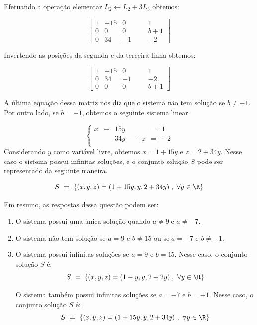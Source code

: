 \begin{solution}
Efetuando a operação elementar $L_2 \leftarrow L_2 + 3L_3$ obtemos:

$$ \left[\begin{array}{rrrr|rc}
  1 &   -15  &    0  & & &   1    \\
  0 &     0  &    0  & & &   b+1  \\ 
  0 &    34  &   -1  & & &   -2   \end{array}\right] $$

Invertendo as posições da segunda e da terceira linha obtemos:

$$ \left[\begin{array}{rrrr|rc}
  1 &   -15  &    0  & & &    1   \\
  0 &    34  &   -1  & & &   -2   \\ 
  0 &     0  &    0  & & &   b+1   \end{array}\right] $$

A última equação dessa matriz nos diz que o sistema não tem solução se $b \neq -1$.
Por outro lado, se $b=-1$, obtemos o seguinte sistema linear

$$\left\{\begin{array}{rrrrrrr}
 x & - &  15y &   &     & = &  1\\
   &   &  34y & - &   z & = & -2\\  \end{array} \right.$$\noindent 
Considerando $y$ como variável livre, obtemos $x=1+15y$ e $z=2+34y$. Nesse caso o sistema possui infinitas soluções, e o conjunto solução $S$ pode ser representado da seguinte maneira.

$$S\ =\ \left\{ (x,y,z) = (1+15y, y , 2+34y)\ ,\ \forall y \in \R \right\} $$

\bigskip
Em resumo, as respostas dessa questão podem ser:

\bigskip
\begin{enumerate}
\item[(a)] O sistema possui uma única solução quando $a \neq 9$ e $a \neq -7$.
\item[(b)] O sistema não tem solução se $a=9$ e $b \neq 15$ ou se $a=-7$ e $b\neq -1$.
\item[(c)] O sistema possui infinitas soluções se $a=9$ e $b=15$. Nesse caso, o conjunto solução $S$ é:
$$S\ =\ \left\{ (x,y,z) = (1-y, y , 2+2y)\ ,\ \forall y \in \R \right\} $$

O sistema também possui infinitas soluções se $a=-7$ e $b=-1$.  Nesse caso, o conjunto solução $S$ é:
$$S\ =\ \left\{ (x,y,z) = (1+15y, y , 2+34y)\ ,\ \forall y \in \R \right\} $$
\end{enumerate}
\end{solution}

